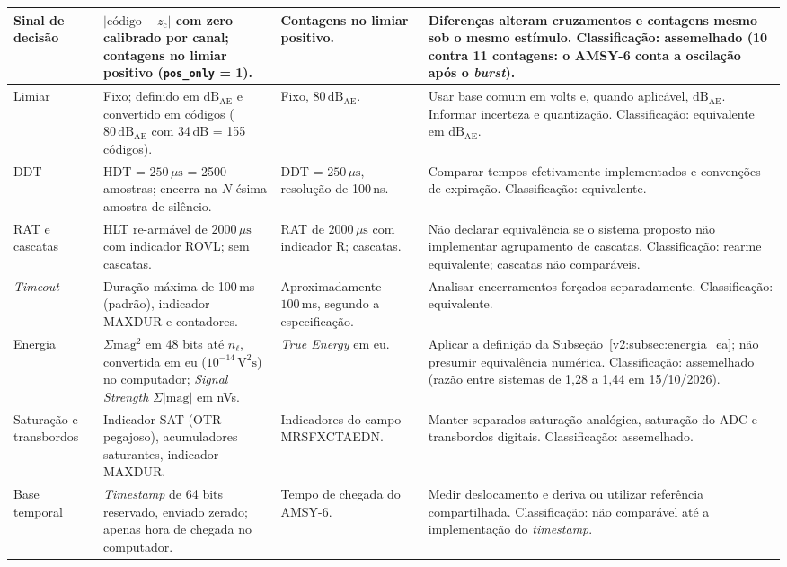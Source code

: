 \begin{longtable}{|
		>{\raggedright\arraybackslash}p{3.0cm}|
		>{\raggedright\arraybackslash}p{3.7cm}|
		>{\raggedright\arraybackslash}p{3.7cm}|
		>{\raggedright\arraybackslash}p{3.8cm}|}
	\hline
	Sinal de decisão & \(|\text{código} - z_{\mathrm{c}}|\) com zero calibrado por canal; contagens no limiar positivo (\texttt{pos\_only} = 1). & Contagens no limiar positivo. & Diferenças alteram cruzamentos e contagens mesmo sob o mesmo estímulo. Classificação: assemelhado (10 contra 11 contagens: o AMSY-6 conta a oscilação após o \textit{burst}). \\
	\hline
	Limiar & Fixo; definido em \(\mathrm{dB}_{\mathrm{AE}}\) e convertido em códigos (\(80\,\mathrm{dB}_{\mathrm{AE}}\) com 34\,dB = 155 códigos). & Fixo, \(80\,\mathrm{dB}_{\mathrm{AE}}\). & Usar base comum em volts e, quando aplicável, \(\mathrm{dB}_{\mathrm{AE}}\). Informar incerteza e quantização. Classificação: equivalente em \(\mathrm{dB}_{\mathrm{AE}}\). \\
	\hline
	DDT & HDT = \(250\,\mu\mathrm{s}\) = 2500 amostras; encerra na \(N\)-ésima amostra de silêncio. & DDT = \(250\,\mu\mathrm{s}\), resolução de 100\,ns. & Comparar tempos efetivamente implementados e convenções de expiração. Classificação: equivalente. \\
	\hline
	RAT e cascatas & HLT re-armável de \(2000\,\mu\mathrm{s}\) com indicador ROVL; sem cascatas. & RAT de \(2000\,\mu\mathrm{s}\) com indicador R; cascatas. & Não declarar equivalência se o sistema proposto não implementar agrupamento de cascatas. Classificação: rearme equivalente; cascatas não comparáveis. \\
	\hline
	\textit{Timeout} & Duração máxima de 100\,ms (padrão), indicador MAXDUR e contadores. & Aproximadamente \(100\,\mathrm{ms}\), segundo a especificação. & Analisar encerramentos forçados separadamente. Classificação: equivalente. \\
	\hline
	Energia & \(\Sigma \mathrm{mag}^2\) em 48 bits até \(n_\ell\), convertida em eu (\(10^{-14}\,\mathrm{V^2s}\)) no computador; \textit{Signal Strength} \(\Sigma|\mathrm{mag}|\) em nVs. & \textit{True Energy} em eu. & Aplicar a definição da Subseção~\ref{v2:subsec:energia_ea}; não presumir equivalência numérica. Classificação: assemelhado (razão entre sistemas de 1,28 a 1,44 em 15/10/2026). \\
	\hline
	Saturação e transbordos & Indicador SAT (OTR pegajoso), acumuladores saturantes, indicador MAXDUR. & Indicadores do campo MRSFXCTAEDN. & Manter separados saturação analógica, saturação do ADC e transbordos digitais. Classificação: assemelhado. \\
	\hline
	Base temporal & \textit{Timestamp} de 64 bits reservado, enviado zerado; apenas hora de chegada no computador. & Tempo de chegada do AMSY-6.  & Medir deslocamento e deriva ou utilizar referência compartilhada. Classificação: não comparável até a implementação do \textit{timestamp}. \\

\end{longtable}
